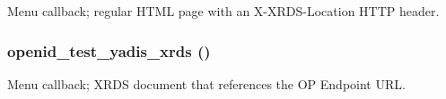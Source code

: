 \label{openid__test_8module_a9159017197fedc11b3676d8fbd9c6d8d}
Menu callback; regular HTML page with an X-\/XRDS-\/Location HTTP header. \hypertarget{openid__test_8module_aa6175d4d4d7c7f49a8727d99cfc71fa5}{
\subsubsection[{openid\_\-test\_\-yadis\_\-xrds}]{\setlength{\rightskip}{0pt plus 5cm}openid\_\-test\_\-yadis\_\-xrds ()}}
\label{openid__test_8module_aa6175d4d4d7c7f49a8727d99cfc71fa5}
Menu callback; XRDS document that references the OP Endpoint URL. 